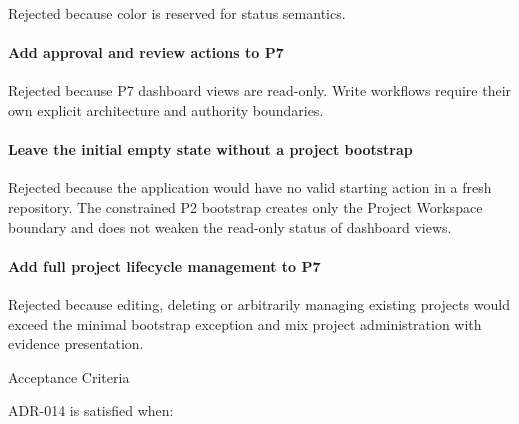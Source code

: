 Rejected because color is reserved for status semantics.

\hypertarget{add-approval-and-review-actions-to-p7}{%
\paragraph{Add approval and review actions to P7}\label{add-approval-and-review-actions-to-p7}}

Rejected because P7 dashboard views are read-only. Write workflows require their own explicit architecture and authority boundaries.

\hypertarget{leave-the-initial-empty-state-without-a-project-bootstrap}{%
\paragraph{Leave the initial empty state without a project bootstrap}\label{leave-the-initial-empty-state-without-a-project-bootstrap}}

Rejected because the application would have no valid starting action in a fresh repository. The constrained P2 bootstrap creates only the Project Workspace boundary and does not weaken the read-only status of dashboard views.

\hypertarget{add-full-project-lifecycle-management-to-p7}{%
\paragraph{Add full project lifecycle management to P7}\label{add-full-project-lifecycle-management-to-p7}}

Rejected because editing, deleting or arbitrarily managing existing projects would exceed the minimal bootstrap exception and mix project administration with evidence presentation.

Acceptance Criteria

ADR-014 is satisfied when:

